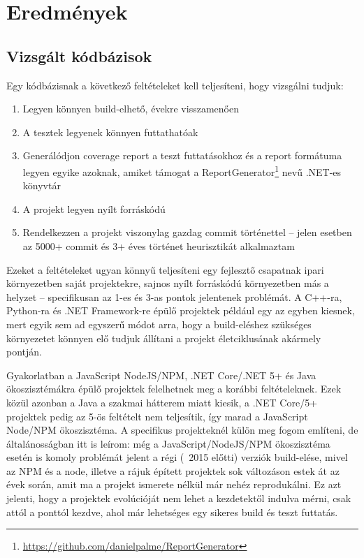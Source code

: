 \chapter{Eredmények}
\label{ch:results}

\section{Vizsgált kódbázisok}

Egy kódbázisnak a következő feltételeket kell teljesíteni, hogy vizsgálni tudjuk:
\begin{enumerate}
    \item Legyen könnyen build-elhető, évekre visszamenően
    \item A tesztek legyenek könnyen futtathatóak
    \item Generálódjon coverage report a teszt futtatásokhoz és a report formátuma legyen egyike azoknak, amiket támogat a ReportGenerator\footnote{\url{https://github.com/danielpalme/ReportGenerator}} nevű .NET-es könyvtár
    \item A projekt legyen nyílt forráskódú
    \item Rendelkezzen a projekt viszonylag gazdag commit történettel -- jelen esetben az 5000+ commit és 3+ éves történet heurisztikát alkalmaztam
\end{enumerate}

Ezeket a feltételeket ugyan könnyű teljesíteni egy fejlesztő csapatnak ipari környezetben saját projektekre, sajnos nyílt forráskódú környezetben más a helyzet -- specifikusan az 1-es és 3-as pontok jelentenek problémát. A C++-ra, Python-ra és .NET Framework-re épülő projektek például egy az egyben kiesnek, mert egyik sem ad egyszerű módot arra, hogy a build-eléshez szükséges környezetet könnyen elő tudjuk állítani a projekt életciklusának akármely pontján.

Gyakorlatban a JavaScript NodeJS/NPM, .NET Core/.NET 5+ és Java ökoszisztémákra épülő projektek felelhetnek meg a korábbi feltételeknek. Ezek közül azonban a Java a szakmai hátterem miatt kiesik, a .NET Core/5+ projektek pedig az 5-ös feltételt nem teljesítik, így marad a JavaScript Node/NPM ökoszisztéma. A specifikus projekteknél külön meg fogom említeni, de általánosságban itt is leírom: még a JavaScript/NodeJS/NPM ökoszisztéma esetén is komoly problémát jelent a régi (~2015 előtti) verziók build-elése, mivel az NPM és a node, illetve a rájuk épített projektek sok változáson estek át az évek során, amit ma a projekt ismerete nélkül már nehéz reprodukálni. Ez azt jelenti, hogy a projektek evolúcióját nem lehet a kezdetektől indulva mérni, csak attól a ponttól kezdve, ahol már lehetséges egy sikeres build és teszt futtatás.

